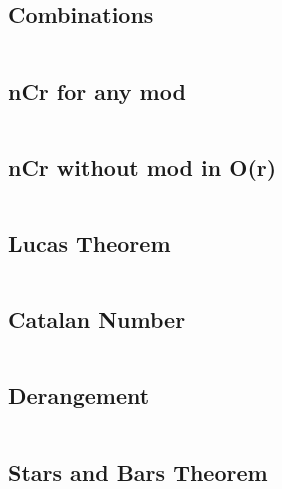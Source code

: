 \subsection{\small Combinations  \scriptsize}
\inputminted[breaklines, breakanywhere]{c++}{code/04-Combinatorics and Probability/01-Combinations.cpp}

\subsection{\small nCr for any mod  \scriptsize}
\inputminted[breaklines, breakanywhere]{c++}{code/04-Combinatorics and Probability/02-nCr for any mod.cpp}

\subsection{\small nCr without mod in O(r)  \scriptsize}
\inputminted[breaklines, breakanywhere]{c++}{code/04-Combinatorics and Probability/03-nCr without mod in O(r).cpp}

\subsection{\small Lucas Theorem  \scriptsize}
\inputminted[breaklines, breakanywhere]{c++}{code/04-Combinatorics and Probability/04-Lucas Theorem.cpp}

\subsection{\small Catalan Number  \scriptsize}
\inputminted[breaklines, breakanywhere]{c++}{code/04-Combinatorics and Probability/05-Catalan Number.cpp}

\subsection{\small Derangement  \scriptsize}
\inputminted[breaklines, breakanywhere]{c++}{code/04-Combinatorics and Probability/06-Derangement.cpp}

\subsection{\small Stars and Bars Theorem  \scriptsize}
\inputminted[breaklines, breakanywhere]{c++}{code/04-Combinatorics and Probability/07-Stars and Bars Theorem.cpp}

